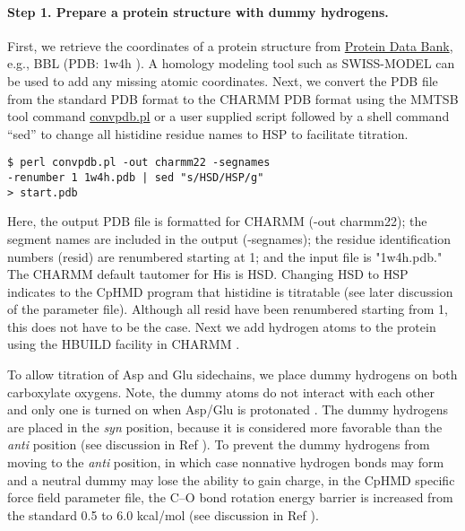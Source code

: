 \paragraph{Step 1. Prepare a protein structure with dummy hydrogens.}
First, we retrieve the coordinates of a protein structure
from \href{https://www.rcsb.org/}{Protein Data Bank}\cite{Berman_Bourne_2000_NucleicAcidsRes.},
e.g., BBL (PDB: 1w4h \cite{Ferguson_Fersht_2005_J.Mol.Biol.}).
A homology modeling tool such as SWISS-MODEL\cite{Waterhouse_Schwede_2018_NucleicAcidsRes.} 
can be used to add any missing atomic coordinates.
Next, we convert the PDB file from the standard PDB format to the CHARMM PDB format using the MMTSB tool command \cite{Feig_Brooks_2004_J.Mol.Graph.Model.} \href{http://blue11.bch.msu.edu/mmtsb/convpdb.pl}{convpdb.pl}
or a user supplied script followed by a shell command ``sed'' to
change all histidine residue names to HSP to facilitate titration.

%
\begin{lstlisting}
$ perl convpdb.pl -out charmm22 -segnames
-renumber 1 1w4h.pdb | sed "s/HSD/HSP/g" 
> start.pdb
\end{lstlisting}
%
Here, the output PDB file is formatted for CHARMM (-out charmm22); the segment names are included in the output (-segnames); the residue identification numbers (resid) are renumbered starting at 1; and 
the input file is "1w4h.pdb."
The CHARMM default tautomer for His is HSD.
Changing HSD to HSP indicates to the CpHMD program that histidine is titratable (see later discussion of the parameter file).
Although all resid have been renumbered starting from 1, this does not have to be the case.
Next we add hydrogen atoms to the protein using the HBUILD facility\cite{Brunger_Karplus_1988_Proteins} in CHARMM
\cite{Brooks_Karplus_2009_J.Comput.Chem.}.

To allow titration of Asp and Glu sidechains, we place dummy hydrogens on both carboxylate oxygens.
Note, the dummy atoms do not interact with each other 
and only one is turned on when Asp/Glu is protonated
\cite{Khandogin_Brooks_2005_Biophys.J.}.
The dummy hydrogens are placed in the \textit{syn} position, 
because it is considered
more favorable than the \textit{anti} position
(see discussion in Ref \cite{Khandogin_Brooks_2005_Biophys.J.}).
To prevent the dummy hydrogens from moving to the \textit{anti} position, 
in which case nonnative hydrogen bonds may form
and a neutral dummy may lose the ability to gain charge,
in the CpHMD specific force field parameter file,
the C--O bond rotation energy barrier
is increased from the standard 0.5 to 6.0 kcal/mol
(see discussion in Ref \cite{Khandogin_Brooks_2005_Biophys.J.}).

